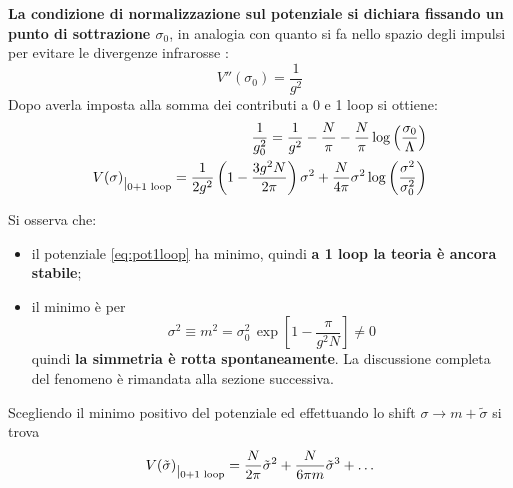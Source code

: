 \documentclass[a4paper,11pt]{amsart}
\newcommand{\nl}{\vskip 0.3cm}
\newcommand{\sigmatilde}{\tilde{\sigma}}
\begin{document}
\textbf{La condizione di normalizzazione sul potenziale si dichiara fissando un punto di sottrazione $\sigma_0$}, in analogia con quanto si fa nello spazio degli impulsi per evitare le divergenze infrarosse \cite{Coleman1973}:
\[ 
V''(\sigma_0) = \frac{1}{g^2}
\]
Dopo averla imposta alla somma dei contributi a 0 e 1 loop si ottiene:
\begin{align}
 \frac{1}{g_0^2} = \frac{1}{g^2} - \frac{N}{\pi} - \frac{N}{\pi}\log\left(\frac{\sigma_0}{\Lambda}\right) \label{eq:rinormalizzazione}\\
 V(\sigma)\raisebox{-0.15cm}{$|_{\text{0+1 loop}}$} = \frac{1}{2g^2}\left(1-\frac{3g^2N}{2\pi}\right)\sigma^2 + \frac{N}{4\pi}\sigma^2\log\left(\frac{\sigma^2}{\sigma_0^2}\right) 
 \label{eq:pot1loop}
 \end{align}
\nl

Si osserva che:
\begin{itemize}
 \item il potenziale \ref{eq:pot1loop} ha minimo, quindi \textbf{a 1 loop la teoria è ancora stabile};
 \item il minimo è per 
 \begin{equation}
 \sigma^2 \equiv m^2 = \sigma_0^2\,\exp\left[1-\frac{\pi}{g^2N}\right] \neq 0 \label{eq:minimo}
 \end{equation} quindi \textbf{la simmetria è rotta spontaneamente}. La discussione completa del fenomeno è rimandata alla sezione successiva.
\end{itemize}
Scegliendo il minimo positivo del potenziale ed effettuando lo shift $\sigma \to m + \sigmatilde$ si trova
\begin{align}
 V(\sigmatilde)\raisebox{-0.15cm}{$|_{\text{0+1 loop}}$} = \frac{N}{2\pi}\sigmatilde^2 +\frac{N}{6\pi m}\sigmatilde^3 + \dots \label{eq:potenziale}
\end{align}
\nl
\end{document}
